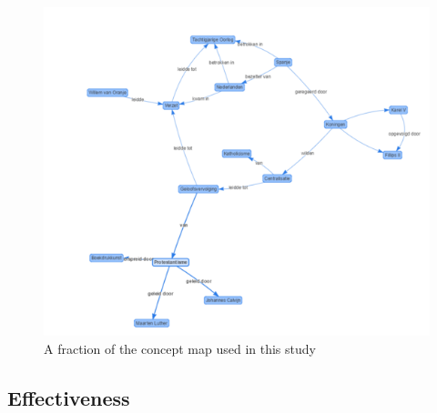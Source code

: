 \begin{figure}
    \centering
    \includegraphics[width=\textwidth]{img/conceptmap.png}
    \caption{A fraction of the concept map used in this study}
    \label{fig:examplemap}
\end{figure}

\subsection{Effectiveness}

